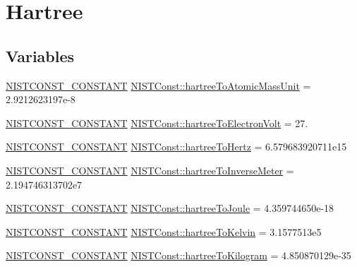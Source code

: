 \hypertarget{group___n_i_s_t_const-_hartree}{}\section{Hartree}
\label{group___n_i_s_t_const-_hartree}
\subsection*{Variables}
\begin{DoxyCompactItemize}
\item 
\mbox{\hyperlink{group___n_i_s_t_const-_macros_ga2b0fc1d7452373f816175dd86ce26729}{N\+I\+S\+T\+C\+O\+N\+S\+T\+\_\+\+C\+O\+N\+S\+T\+A\+NT}} \mbox{\hyperlink{group___n_i_s_t_const-_hartree_gadd551bb415cf6590fe86cbab53282790}{N\+I\+S\+T\+Const\+::hartree\+To\+Atomic\+Mass\+Unit}} = 2.\+9212623197e-\/8
\item 
\mbox{\hyperlink{group___n_i_s_t_const-_macros_ga2b0fc1d7452373f816175dd86ce26729}{N\+I\+S\+T\+C\+O\+N\+S\+T\+\_\+\+C\+O\+N\+S\+T\+A\+NT}} \mbox{\hyperlink{group___n_i_s_t_const-_hartree_gaba497bbf24c554950d652cdfa84b102c}{N\+I\+S\+T\+Const\+::hartree\+To\+Electron\+Volt}} = 27.
\item 
\mbox{\hyperlink{group___n_i_s_t_const-_macros_ga2b0fc1d7452373f816175dd86ce26729}{N\+I\+S\+T\+C\+O\+N\+S\+T\+\_\+\+C\+O\+N\+S\+T\+A\+NT}} \mbox{\hyperlink{group___n_i_s_t_const-_hartree_gabf95934e6d5fe9b153d31d35a67a190c}{N\+I\+S\+T\+Const\+::hartree\+To\+Hertz}} = 6.\+579683920711e15
\item 
\mbox{\hyperlink{group___n_i_s_t_const-_macros_ga2b0fc1d7452373f816175dd86ce26729}{N\+I\+S\+T\+C\+O\+N\+S\+T\+\_\+\+C\+O\+N\+S\+T\+A\+NT}} \mbox{\hyperlink{group___n_i_s_t_const-_hartree_ga7b651bbca9217e235a1276cfdaac9d6e}{N\+I\+S\+T\+Const\+::hartree\+To\+Inverse\+Meter}} = 2.\+194746313702e7
\item 
\mbox{\hyperlink{group___n_i_s_t_const-_macros_ga2b0fc1d7452373f816175dd86ce26729}{N\+I\+S\+T\+C\+O\+N\+S\+T\+\_\+\+C\+O\+N\+S\+T\+A\+NT}} \mbox{\hyperlink{group___n_i_s_t_const-_hartree_ga477b51b8a0e743da7b56031105b4dd38}{N\+I\+S\+T\+Const\+::hartree\+To\+Joule}} = 4.\+359744650e-\/18
\item 
\mbox{\hyperlink{group___n_i_s_t_const-_macros_ga2b0fc1d7452373f816175dd86ce26729}{N\+I\+S\+T\+C\+O\+N\+S\+T\+\_\+\+C\+O\+N\+S\+T\+A\+NT}} \mbox{\hyperlink{group___n_i_s_t_const-_hartree_ga11349ff8dc3b4b39764521c290d59ec1}{N\+I\+S\+T\+Const\+::hartree\+To\+Kelvin}} = 3.\+1577513e5
\item 
\mbox{\hyperlink{group___n_i_s_t_const-_macros_ga2b0fc1d7452373f816175dd86ce26729}{N\+I\+S\+T\+C\+O\+N\+S\+T\+\_\+\+C\+O\+N\+S\+T\+A\+NT}} \mbox{\hyperlink{group___n_i_s_t_const-_hartree_ga61c0da502aec40e97aaa90bbbaf8afb2}{N\+I\+S\+T\+Const\+::hartree\+To\+Kilogram}} = 4.\+850870129e-\/35
\end{DoxyCompactItemize}


